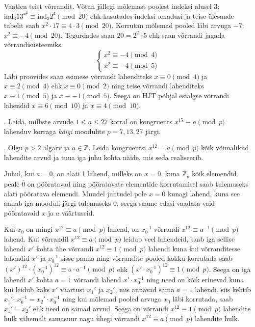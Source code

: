 \documentclass[a4paper, 10pt]{article}
\newcommand{\Z}{\mathbb{Z}}
\newcommand{\w}{\overline}
\newcommand{\ind}{\mathrm{ind}}
\begin{document}
Vaatlen teist võrrandit. Võtan jällegi mõlemast poolest indeksi alusel 3: $\ind_{3}13^{x^2}\equiv\ind_{3}2^4\pmod{20}$ ehk kasutades indeksi omadusi ja teise ülesande tabelit saab $x^2\cdot 17\equiv4\cdot3\pmod{20}$. Korrutan mõlemad pooled läbi arvuga $-7$: $x^2\equiv-4\pmod{20}$. Tegurdades saan $20=2^2\cdot5$ ehk saan võrrandi jagada võrrandisüsteemiks $$\begin{cases}x^2\equiv-4\pmod{4}\\x^2\equiv-4\pmod{5}\end{cases}$$ Läbi proovides saan esimese võrrandi lahenditeks $x\equiv0\pmod4$ ja $x\equiv2\pmod4$ ehk $x\equiv0\pmod2$ ning teise võrrandi lahenditeks $x\equiv1\pmod5$ ja $x\equiv-1\pmod5$. Seega on HJT põhjal esialgse võrrandi lahendid $x\equiv6\pmod{10}$ ja $x\equiv 4\pmod{10}$.
\bigskip

. Leida, milliste arvude $1\leq a\leq 27$ korral on kongruents $x^{15}\equiv a\pmod{p}$ lahenduv korraga \emph{kõigi} moodulite $p=7,13,27$ järgi.

\bigskip

. Olgu $p>2$ algarv ja $a\in\Z$. Leida kongruentsi $x^{12}=a \pmod{p}$ kõik võimalikud lahendite arvud ja tuua iga juhu kohta näide, mis seda realiseerib. 

\bigskip
Juhul, kui $a=0$, on alati 1 lahend, milleks on $x=0$, kuna $\Z_p$ kõik elemendid peale $\w0$ on pööratavad ning pööratavate elementide korrutamisel saab tulemuseks alati pööratava elemendi. Muudel juhtudel pole $x=0$ kunagi lahend, kuna see annab iga mooduli järgi tulemuseks 0, seega saame edasi vaadata vaid pööratavaid $x$ ja $a$ väärtuseid.

Kui $x_0$ on mingi $x^{12}\equiv a\pmod p$ lahend, on $x_0^{-1}$ võrrandi $x^{12}\equiv a^{-1}\pmod p$ lahend. Kui võrrandil $x^{12}\equiv a\pmod p$ leidub veel lahendeid, saab iga sellise lahendi $x'$ kohta ühe võrrandi $x^{12}\equiv1\pmod p$ lahendi kuna kui võrranditesse lahendid $x'$ ja $x_0^{-1}$ sisse panna ning võrrandite pooled kokku korrutada saab $(x')^{12}\cdot{(x_0^{-1})^{12}}\equiv a\cdot a^{-1}\pmod p$ ehk $(x'\cdot x_0^{-1})^{12}\equiv1\pmod p$. Seega on iga lahendi $x'$ kohta $a=1$ võrrandi lahend $x'\cdot x_0^{-1}$ ning need on kõik erinevad kuna kui leidub kaks $x'$ väärtust $x_1'$ ja $x_2'$, mis annavad sama $a=1$ lahendi, siis kehtib $x_1'\cdot x_0^{-1}=x_2'\cdot x_0^{-1}$ ning kui mõlemad pooled arvuga $x_0$ läbi korrutada, saab $x_1'=x_2'$ ehk need on samad arvud. Seega on võrrandi $x^{12}\equiv1\pmod p$ lahendite hulk vähemalt samasuur nagu ühegi võrrandi $x^{12}\equiv a\pmod p$ lahendite hulk.
\end{document}
